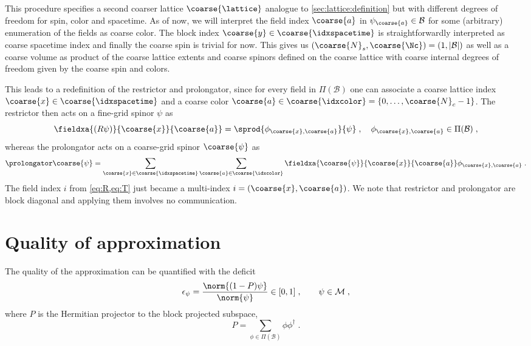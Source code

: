 This procedure specifies a second coarser lattice $\coarse{\lattice}$ analogue to \cref{sec:lattice:definition} but with different degrees of freedom for spin, color and spacetime.
As of now, we will interpret the field index $\coarse{a}$ in $\psi_{\coarse{a}} \in \mathcal{B}$ for some (arbitrary) enumeration of the fields as coarse color.
The block index $\coarse{y} \in \coarse{\idxspacetime}$ is straightforwardly interpreted as coarse spacetime index and finally the coarse spin is trivial for now.
This gives us $(\coarse{N}_s, \coarse{\Nc}) = (1, \lvert \mathcal{B} \rvert)$ as well as a coarse volume as product of the coarse lattice extents and coarse spinors defined on the coarse lattice with coarse internal degrees of freedom given by the coarse spin and colors.

This leads to a redefinition of the restrictor and prolongator, since for every field in $\Pi(\mathcal{B})$ one can associate a coarse lattice index $\coarse{x} \in \coarse{\idxspacetime}$ and a coarse color $\coarse{a} \in \coarse{\idxcolor} = \{0, \ldots, \coarse{N}_c-1 \}$.
The restrictor then acts on a fine-grid spinor $\psi$ as
\begin{equation} \label{eq:R:redef:1}
\fieldxa{(R \psi)}{\coarse{x}}{\coarse{a}} = \sprod{\phi_{\coarse{x}, \coarse{a}}}{\psi} \;,
\quad
\phi_{\coarse{x}, \coarse{a}} \in \Pi(\mathcal{B}) \;,
\end{equation}
whereas the prolongator acts on a coarse-grid spinor $\coarse{\psi}$ as
\begin{equation} \label{eq:T:redef:1}
\prolongator \coarse{\psi} =
\sum_{\coarse{x} \in \coarse{\idxspacetime}}
\sum_{\coarse{a} \in \coarse{\idxcolor}}
    \fieldxa{\coarse{\psi}}{\coarse{x}}{\coarse{a}} \phi_{\coarse{x}, \coarse{a}} \;.
\end{equation}
The field index $i$ from \cref{eq:R,eq:T} just became a multi-index $i = (\coarse{x}, \coarse{a})$.
We note that restrictor and prolongator are block diagonal and applying them involves no communication.

\section{Quality of approximation}
\label{sec:lc:deficit}

The quality of the approximation can be quantified with the deficit
\begin{equation}
\epsilon_{\psi} = \frac{\norm{ (1-P) \psi }}{\norm{\psi}} \in [0,1] \;,
\qquad
\psi \in \mathcal{M} \;,
\end{equation}
where $P$ is the Hermitian projector to the block projected subspace,
\begin{equation} \label{eq:lc:projector}
P = \sum_{\phi \in \Pi(\mathcal{B})} \phi \phi^{\dagger} \;.
\end{equation}

